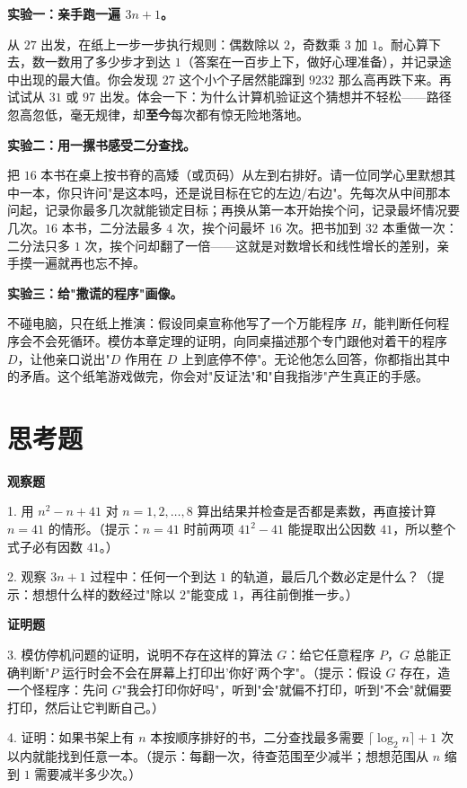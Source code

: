 \begin{shiyan}
\textbf{实验一：亲手跑一遍 $3n+1$。}

从 $27$ 出发，在纸上一步一步执行规则：偶数除以 $2$，奇数乘 $3$ 加 $1$。耐心算下去，数一数用了多少步才到达 $1$（答案在一百步上下，做好心理准备），并记录途中出现的最大值。你会发现 $27$ 这个小个子居然能蹿到 $9232$ 那么高再跌下来。再试试从 $31$ 或 $97$ 出发。体会一下：为什么计算机验证这个猜想并不轻松——路径忽高忽低，毫无规律，却\textbf{至今}每次都有惊无险地落地。

\textbf{实验二：用一摞书感受二分查找。}

把 $16$ 本书在桌上按书脊的高矮（或页码）从左到右排好。请一位同学心里默想其中一本，你只许问"是这本吗，还是说目标在它的左边/右边"。先每次从中间那本问起，记录你最多几次就能锁定目标；再换从第一本开始挨个问，记录最坏情况要几次。$16$ 本书，二分法最多 $4$ 次，挨个问最坏 $16$ 次。把书加到 $32$ 本重做一次：二分法只多 $1$ 次，挨个问却翻了一倍——这就是对数增长和线性增长的差别，亲手摸一遍就再也忘不掉。

\textbf{实验三：给"撒谎的程序"画像。}

不碰电脑，只在纸上推演：假设同桌宣称他写了一个万能程序 $H$，能判断任何程序会不会死循环。模仿本章定理的证明，向同桌描述那个专门跟他对着干的程序 $D$，让他亲口说出"$D$ 作用在 $D$ 上到底停不停"。无论他怎么回答，你都指出其中的矛盾。这个纸笔游戏做完，你会对"反证法"和"自我指涉"产生真正的手感。
\end{shiyan}

\section*{思考题}

\textbf{观察题}

1. 用 $n^2 - n + 41$ 对 $n=1,2,\dots,8$ 算出结果并检查是否都是素数，再直接计算 $n=41$ 的情形。（提示：$n=41$ 时前两项 $41^2-41$ 能提取出公因数 $41$，所以整个式子必有因数 $41$。）

2. 观察 $3n+1$ 过程中：任何一个到达 $1$ 的轨道，最后几个数必定是什么？（提示：想想什么样的数经过"除以 $2$"能变成 $1$，再往前倒推一步。）

\textbf{证明题}

3. 模仿停机问题的证明，说明不存在这样的算法 $G$：给它任意程序 $P$，$G$ 总能正确判断"$P$ 运行时会不会在屏幕上打印出'你好'两个字"。（提示：假设 $G$ 存在，造一个怪程序：先问 $G$"我会打印你好吗"，听到"会"就偏不打印，听到"不会"就偏要打印，然后让它判断自己。）

4. 证明：如果书架上有 $n$ 本按顺序排好的书，二分查找最多需要 $\lceil \log_2 n \rceil + 1$ 次以内就能找到任意一本。（提示：每翻一次，待查范围至少减半；想想范围从 $n$ 缩到 $1$ 需要减半多少次。）

